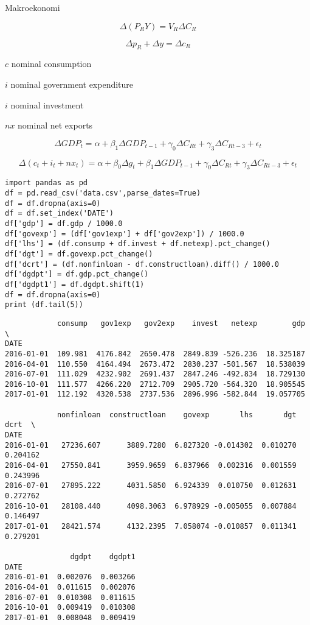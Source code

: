 \documentclass[12pt,fleqn]{article}\usepackage{../../common}
\begin{document}
Makroekonomi

$$ \Delta (P_RY) = V_R\Delta C_R$$

$$ \Delta p_R + \Delta y = \Delta c_R$$




$c$ nominal consumption 

$i$ nominal government expenditure

$i$ nominal investment 

$nx$ nominal net exports

$$ \Delta GDP_t = 
\alpha + \beta_1 \Delta GDP_{t-1} + 
\gamma_0 \Delta C_{Rt} + \gamma_3 \Delta C_{Rt-3} + \epsilon_t 
$$

$$ 
\Delta (c_t + i_t + nx_t) = 
\alpha + \beta_0 \Delta g_t + \beta_1 \Delta GDP_{t-1} + 
\gamma_0 \Delta C_{Rt} + \gamma_3 \Delta C_{Rt-3} + \epsilon_t 
$$


\begin{verbatim}
import pandas as pd
df = pd.read_csv('data.csv',parse_dates=True)
df = df.dropna(axis=0)
df = df.set_index('DATE')
df['gdp'] = df.gdp / 1000.0
df['govexp'] = (df['gov1exp'] + df['gov2exp']) / 1000.0
df['lhs'] = (df.consump + df.invest + df.netexp).pct_change() 
df['dgt'] = df.govexp.pct_change() 
df['dcrt'] = (df.nonfinloan - df.constructloan).diff() / 1000.0
df['dgdpt'] = df.gdp.pct_change()
df['dgdpt1'] = df.dgdpt.shift(1)
df = df.dropna(axis=0)
print (df.tail(5))
\end{verbatim}

\begin{verbatim}
            consump   gov1exp   gov2exp    invest   netexp        gdp  \
DATE                                                                    
2016-01-01  109.981  4176.842  2650.478  2849.839 -526.236  18.325187   
2016-04-01  110.550  4164.494  2673.472  2830.237 -501.567  18.538039   
2016-07-01  111.029  4232.902  2691.437  2847.246 -492.834  18.729130   
2016-10-01  111.577  4266.220  2712.709  2905.720 -564.320  18.905545   
2017-01-01  112.192  4320.538  2737.536  2896.996 -582.844  19.057705   

            nonfinloan  constructloan    govexp       lhs       dgt      dcrt  \
DATE                                                                            
2016-01-01   27236.607      3889.7280  6.827320 -0.014302  0.010270  0.204162   
2016-04-01   27550.841      3959.9659  6.837966  0.002316  0.001559  0.243996   
2016-07-01   27895.222      4031.5850  6.924339  0.010750  0.012631  0.272762   
2016-10-01   28108.440      4098.3063  6.978929 -0.005055  0.007884  0.146497   
2017-01-01   28421.574      4132.2395  7.058074 -0.010857  0.011341  0.279201   

               dgdpt    dgdpt1  
DATE                            
2016-01-01  0.002076  0.003266  
2016-04-01  0.011615  0.002076  
2016-07-01  0.010308  0.011615  
2016-10-01  0.009419  0.010308  
2017-01-01  0.008048  0.009419  
\end{verbatim}
\end{document}
